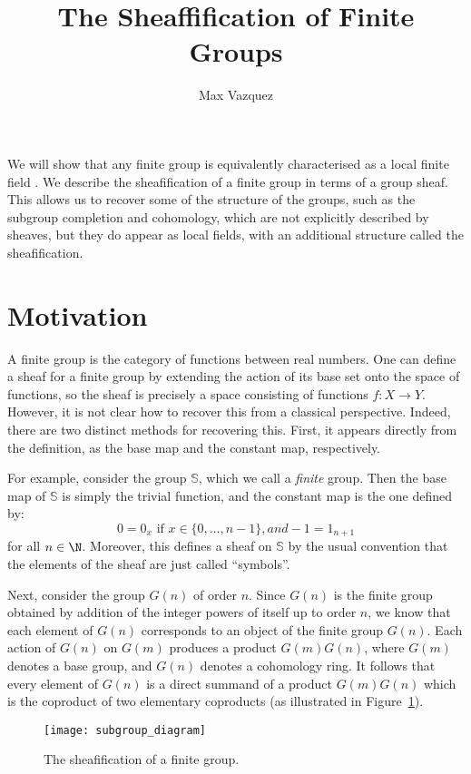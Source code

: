 \documentclass[a4paper,reqno,oneside]{article}
\begin{document}
\title{The Sheaffification of Finite Groups}
\author{Max Vazquez}
\maketitle


We will show that any finite group is equivalently characterised as a local finite field \cite{KellyGroup}. We describe the sheafification of a finite group in terms of a group sheaf. This allows us to recover some of the structure of the groups, such as the subgroup completion and cohomology, which are not explicitly described by sheaves, but they do appear as local fields, with an additional structure called the sheafification. 

\section*{Motivation}
A finite group is the category of functions between real numbers. One can define a sheaf for a finite group by extending the action of its base set onto the space of functions, so the sheaf is precisely a space consisting of functions $f: X \rightarrow Y$. However, it is not clear how to recover this from a classical perspective. Indeed, there are two distinct methods for recovering this. First, it appears directly from the definition, as the base map and the constant map, respectively. 

For example, consider the group $\mathbb S$, which we call a \emph{finite} group. Then the base map of $\mathbb S$ is simply the trivial function, and the constant map is the one defined by:
\[
0 = 0_x \text{ if } x \in \{0,\dots,n-1\}, and 
-1 = 1_{n+1}
\]
for all $n \in \N$. Moreover, this defines a sheaf on $\mathbb S$ by the usual convention that the elements of the sheaf are just called ``symbols''.

Next, consider the group $G(n)$ of order $n$. Since $G(n)$ is the finite group obtained by addition of the integer powers of itself up to order $n$, we know that each element of $G(n)$ corresponds to an object of the finite group $G(n)$. Each action of $G(n)$ on $G(m)$ produces a product $G(m)G(n)$, where $G(m)$ denotes a base group, and $G(n)$ denotes a cohomology ring. It follows that every element of $G(n)$ is a direct summand of a product $G(m)G(n)$ which is the coproduct of two elementary coproducts (as illustrated in Figure~\ref{fig:subgroup}).  

\begin{figure}[h!]
\centering
\texttt{[image: subgroup\_diagram]}
\caption{The sheafification of a finite group.}
\label{fig:subgroup}
\end{figure}
\end{document}
